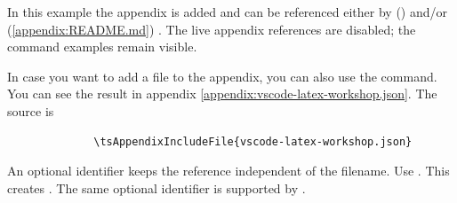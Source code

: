 In this example the appendix  is added and can be
referenced either by 
\ifUseTsAppendix
    ()
\fi
and/or
%
\ifUseTsAppendix
    \space(\ref{appendix:README.md})%
\fi
.
\ifUseTsAppendix\else
    The live appendix references are disabled; the command examples remain visible.
\fi
\bigbreak

In case you want to add a file to the appendix, you can also use the
 command.
\ifUseTsAppendix
    You can see the result in appendix \ref{appendix:vscode-latex-workshop.json}.
\fi
The source is

\begin{figure}[H]
    \small
    \centering
    \begin{BVerbatim}
        \tsAppendixIncludeFile{vscode-latex-workshop.json}
    \end{BVerbatim}
\end{figure}

An optional identifier keeps the reference independent of the filename.
Use .
This creates . The same optional identifier is
supported by .
